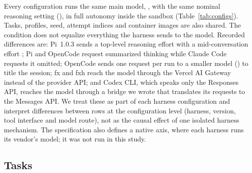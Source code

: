Every configuration runs the same main model, , with the same nominal reasoning setting (), in full autonomy inside the sandbox (Table~\ref{tab:configs}).
Tasks, profiles, seed, attempt indices and container images are also shared.
The condition does not equalize everything the harness sends to the model.
Recorded differences are: Pi~1.0.3 sends a top-level reasoning effort  with a mid-conversation effort ; Pi and OpenCode request summarized thinking while Claude Code requests it omitted; OpenCode sends one request per run to a smaller model () to title the session; fx and fxh reach the model through the Vercel AI Gateway instead of the provider API; and Codex CLI, which speaks only the Responses API, reaches the model through a bridge we wrote that translates its requests to the Messages API.
We treat these as part of each harness configuration and interpret differences between rows at the configuration level (harness, version, tool interface and model route), not as the causal effect of one isolated harness mechanism.
The specification also defines a native axis, where each harness runs its vendor's model; it was not run in this study.

\begin{table}[t]
\centering
\scriptsize
\resizebox{\linewidth}{!}{}
\caption{Configurations. Values are read from the release rows. The fx and fxh model id is the same model under its Vercel AI Gateway name. Differences inside the fixed-model condition are listed in Section~\ref{sec:fixed}.}
\label{tab:configs}
\end{table}

\subsection{Tasks}

